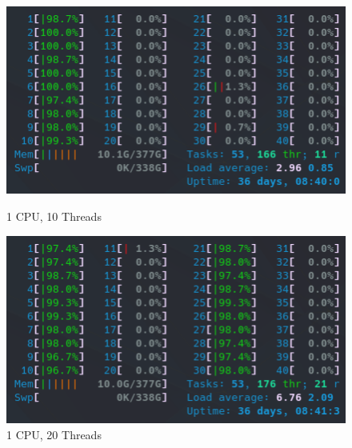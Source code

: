 \begin{figure}[!h]
    \centering
    \captionsetup{width=.48\linewidth}
    \begin{minipage}[t]{0.48\textwidth}
        \includegraphics[width=\textwidth]{figures/htop_cpus/1CPU_10Threads.png}
        \caption{1 CPU, 10 Threads}\label{fig:1CPU_10Threads}
    \end{minipage}
    \hspace{0.4cm}
    \centering
    \captionsetup{width=.48\linewidth}
    \begin{minipage}[t]{0.48\textwidth}
        \includegraphics[width=\textwidth]{figures/htop_cpus/1CPU_20Threads.png}
        \caption{1 CPU, 20 Threads}\label{fig:1CPU_20Threads}
    \end{minipage}


\end{figure}
